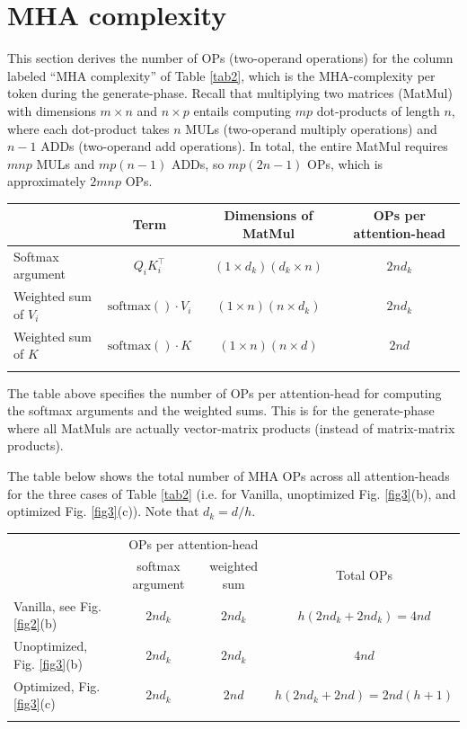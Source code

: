 \documentclass{article}
\newcommand{\mc}[2]{\multicolumn{#1}{c}{#2}}       %
\def\fline{\Xhline{2\arrayrulewidth}}              %
\begin{document}
\section{MHA complexity}
This section derives the number of OPs (two-operand operations) for the column labeled ``MHA complexity'' of Table \ref{tab2}, which is the MHA-complexity per token during the generate-phase. Recall that multiplying two matrices (MatMul) with dimensions $m \times n$ and $n \times p$ entails computing $m p$ dot-products of length $n$, where each dot-product takes $n$ MULs (two-operand multiply operations) and $n-1$ ADDs (two-operand add operations). In total, the entire MatMul requires $mnp$ MULs and $mp(n-1)$ ADDs, so $mp(2n-1)$ OPs, which is approximately $2mnp$ OPs.
\begin{table}[h!] \centering \begin{tabular}{lccc} \fline
                         & Term & Dimensions of MatMul   & OPs per attention-head                    \\ \hline
  Softmax argument       & $Q_i K_i^\top$                & $(1 \times d_k)(d_k \times n)$   & $2nd_k$ \\
  Weighted sum of $V_i$  & $\text{softmax}() \cdot V_i$  & $(1 \times n)(n \times d_k)$    & $2nd_k$ \\
  Weighted sum of $K$    & $\text{softmax}() \cdot K$    & $(1 \times n)(n \times d)$      & $2nd$   \\ \fline
\end{tabular} \end{table}

The table above specifies the number of OPs per attention-head for computing the softmax arguments and the weighted sums. This is for the generate-phase where all MatMuls are actually vector-matrix products (instead of matrix-matrix products).

The table below shows the total number of MHA OPs across all attention-heads for the three cases of Table \ref{tab2} (i.e. for Vanilla, unoptimized Fig. \ref{fig3}(b), and optimized Fig. \ref{fig3}(c)). Note that $d_k = d / h$.
\begin{table}[h!] \centering \begin{tabular}{lccc} \fline
                                  & \mc{2}{OPs per attention-head}   &                            \\
                                  & softmax argument & weighted sum  & Total OPs                  \\ \hline
  Vanilla, see Fig. \ref{fig2}(b) & $2nd_k$          & $2nd_k$       & $h(2nd_k + 2nd_k) = 4nd$    \\
  Unoptimized, Fig. \ref{fig3}(b) & $2nd_k$          & $2nd_k$       & $4nd$                       \\
  Optimized, Fig. \ref{fig3}(c)   & $2nd_k$          & $2nd$         & $h(2nd_k + 2nd) = 2nd(h+1)$ \\ \fline
\end{tabular} \end{table}
\end{document}
